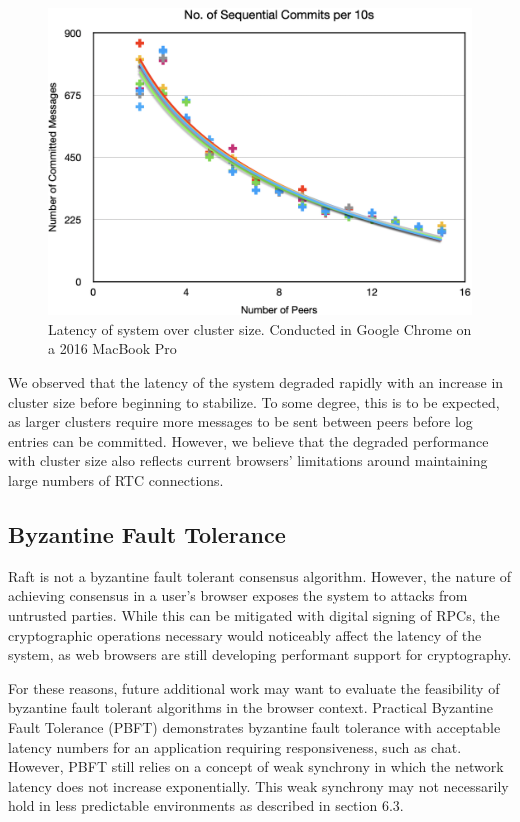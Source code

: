\documentclass[11pt,twocolumn]{article}
\begin{document}
\begin{figure}[t]
\centering
\includegraphics[scale=0.4]{performance}
\caption{Latency of system over cluster size. Conducted in Google Chrome on a 2016 MacBook Pro}
\label{fig:scale}
\end{figure}

We observed that the latency of the system degraded rapidly with an increase in cluster size before beginning to stabilize. To some degree, this is to be expected, as larger clusters require more messages to be sent between peers before log entries can be committed. However, we believe that the degraded performance with cluster size also reflects current browsers' limitations around maintaining large numbers of RTC connections.

\subsection{Byzantine Fault Tolerance}
Raft is not a byzantine fault tolerant consensus algorithm. However, the nature of achieving consensus in a user's browser exposes the system to attacks from untrusted parties. While this can be mitigated with digital signing of RPCs, the cryptographic operations necessary would noticeably affect the latency of the system, as web browsers are still developing performant support for cryptography.

For these reasons, future additional work may want to evaluate the feasibility of byzantine fault tolerant algorithms in the browser context. Practical Byzantine Fault Tolerance (PBFT) \cite{pbftpaper} demonstrates byzantine fault tolerance with acceptable latency numbers for an application requiring responsiveness, such as chat. However, PBFT still relies on a concept of weak synchrony in which the network latency does not increase exponentially. This weak synchrony may not necessarily hold in less predictable environments as described in section 6.3.
\end{document}
